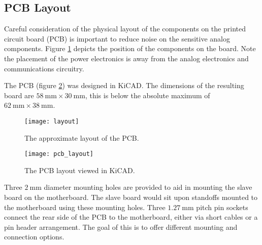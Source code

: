 \subsection{PCB Layout}
\label{sec:pcb-layout}

Careful consideration of the physical layout of the components on the printed circuit board (PCB) is important to reduce noise on the sensitive analog components.
Figure \ref{fig:layout} depicts the position of the components on the board.
Note the placement of the power electronics is away from the analog electronics and communications circuitry.

The PCB (figure \ref{fig:pcb-layout}) was designed in KiCAD.
The dimensions of the resulting board are $\SI{58}{\milli\metre}\times\SI{30}{\milli\metre}$, this is below the absolute maximum of $\SI{62}{\milli\metre}\times\SI{38}{\milli\metre}$.
\begin{figure}[H]
	\centering
	\texttt{[image: layout]}
	\caption{The approximate layout of the PCB.}
	\label{fig:layout}
\end{figure}

\begin{figure}[H]
	\centering
	\texttt{[image: pcb\_layout]}
	\caption{The PCB layout viewed in KiCAD.}
	\label{fig:pcb-layout}
\end{figure}

Three $\SI{2}{\milli\metre}$ diameter mounting holes are provided to aid in mounting the slave board on the motherboard.
The slave board would sit upon standoffs mounted to the motherboard using these mounting holes.
Three $\SI{1.27}{\milli\metre}$ pitch pin sockets connect the rear side of the PCB to the motherboard, either via short cables or a pin header arrangement.
The goal of this is to offer different mounting and connection options.
